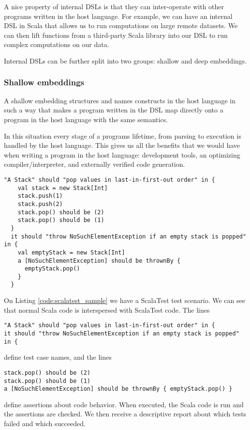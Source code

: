 A nice property of internal DSLs is that they can inter-operate with other programs written in the host language. For example, we can have an internal DSL in Scala that allows us to run computations on large remote datasets. We can then lift functions from a third-party Scala library into our DSL to run complex computations on our data.

Internal DSLs can be further split into two groups: shallow and deep embeddings.

\subsubsection{Shallow embeddings}

A shallow embedding structures and names constructs in the host language in such a way that makes a program written in the DSL map directly onto a program in the host language with the same semantics.

In this situation every stage of a programs lifetime, from parsing to execution is handled by the host language. This gives us all the benefits that we would have when writing a program in the host language: development tools, an optimizing compiler/interpreter, and externally verified code generation.

\begin{lstlisting}[caption=Example ScalaTest code, label=code:scalatest_sample]
  "A Stack" should "pop values in last-in-first-out order" in {
    val stack = new Stack[Int]
    stack.push(1)
    stack.push(2)
    stack.pop() should be (2)
    stack.pop() should be (1)
  }
  it should "throw NoSuchElementException if an empty stack is popped" in {
    val emptyStack = new Stack[Int]
    a [NoSuchElementException] should be thrownBy {
      emptyStack.pop()
    } 
  }
\end{lstlisting}

On Listing \ref{code:scalatest_sample} we have a ScalaTest test scenario. We can see that normal Scala code is interspersed with ScalaTest code.
The lines
\begin{verbatim}
"A Stack" should "pop values in last-in-first-out order" in {
it should "throw NoSuchElementException if an empty stack is popped" in {
\end{verbatim}
define test case names, and the lines
\begin{verbatim}
stack.pop() should be (2)
stack.pop() should be (1)
a [NoSuchElementException] should be thrownBy { emptyStack.pop() }
\end{verbatim}
define assertions about code behavior. When executed, the Scala code is run and the assertions are checked. We then receive a descriptive report about which tests failed and which succeeded.


